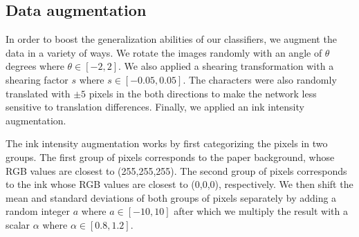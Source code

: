 \subsection{Data augmentation}
\label{sec:data}
In order to boost the generalization abilities of our classifiers, we augment the data in a variety of ways. We rotate the images randomly with an angle of $\theta$ degrees where $\theta \in [-2, 2]$. We also applied a shearing transformation with a shearing factor $s$ where $s \in [-0.05,0.05]$. The characters were also randomly translated with $\pm 5$ pixels in the both directions to make the network less sensitive to translation differences. Finally, we applied an ink intensity augmentation. 

The ink intensity augmentation works by first categorizing the pixels in two groups. The first group of pixels corresponds to the paper background, whose RGB values are closest to (255,255,255). The second group of pixels corresponds to the ink whose RGB values are closest to (0,0,0), respectively. We then shift the mean and standard deviations of both groups of pixels separately by adding a random integer $a$ where $a\in [-10,10]$ after which we multiply the result with a scalar $\alpha$ where $\alpha \in [0.8,1.2]$.